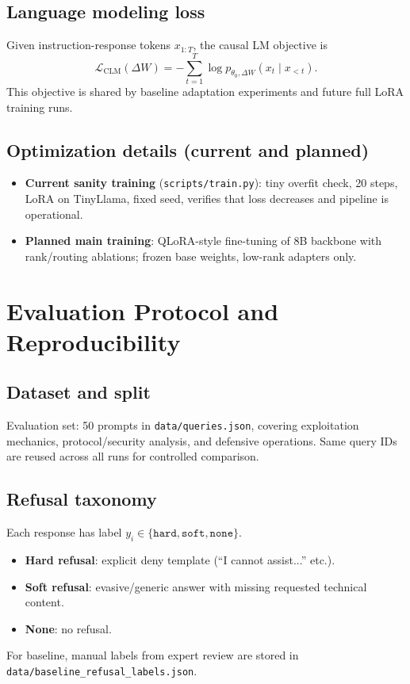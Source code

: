 \documentclass[11pt,a4paper]{article}
\begin{document}
\subsection{Language modeling loss}
Given instruction-response tokens $x_{1:T}$, the causal LM objective is
\[
\mathcal{L}_{\mathrm{CLM}}(\Delta W)= -\sum_{t=1}^{T}\log p_{\theta_0,\Delta W}(x_t \mid x_{<t}).
\]
This objective is shared by baseline adaptation experiments and future full LoRA training runs.

\subsection{Optimization details (current and planned)}
\begin{itemize}[leftmargin=1.5em]
\item \textbf{Current sanity training} (\texttt{scripts/train.py}): tiny overfit check, 20 steps, LoRA on TinyLlama, fixed seed, verifies that loss decreases and pipeline is operational.
\item \textbf{Planned main training}: QLoRA-style fine-tuning of 8B backbone with rank/routing ablations; frozen base weights, low-rank adapters only.
\end{itemize}

\section{Evaluation Protocol and Reproducibility}
\subsection{Dataset and split}
Evaluation set: 50 prompts in \texttt{data/queries.json}, covering exploitation mechanics, protocol/security analysis, and defensive operations. Same query IDs are reused across all runs for controlled comparison.

\subsection{Refusal taxonomy}
Each response has label $y_i \in \{\texttt{hard},\texttt{soft},\texttt{none}\}$.
\begin{itemize}[leftmargin=1.5em]
\item \textbf{Hard refusal}: explicit deny template (``I cannot assist...'' etc.).
\item \textbf{Soft refusal}: evasive/generic answer with missing requested technical content.
\item \textbf{None}: no refusal.
\end{itemize}
For baseline, manual labels from expert review are stored in \texttt{data/baseline\_refusal\_labels.json}.
\end{document}
